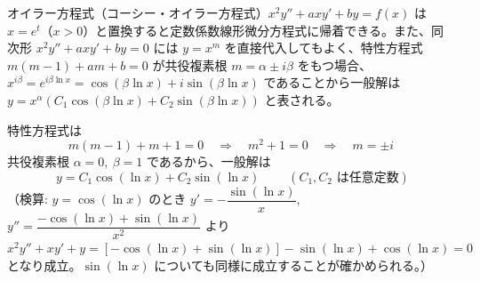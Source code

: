 
オイラー方程式（コーシー・オイラー方程式）$x^{2}y'' + axy' + by = f(x)$ は $x = e^{t}$（$x>0$）と置換すると定数係数線形微分方程式に帰着できる。また、同次形 $x^{2}y''+axy'+by=0$ には $y=x^{m}$ を直接代入してもよく、特性方程式 $m(m-1)+am+b=0$ が共役複素根 $m=\alpha\pm i\beta$ をもつ場合、$x^{i\beta}=e^{i\beta\ln x}=\cos(\beta\ln x)+i\sin(\beta\ln x)$ であることから一般解は $y = x^{\alpha}\left(C_{1}\cos(\beta\ln x)+C_{2}\sin(\beta\ln x)\right)$ と表される。

特性方程式は
\[
m(m-1) + m + 1 = 0
\quad\Longrightarrow\quad
m^{2} + 1 = 0
\quad\Longrightarrow\quad
m = \pm i
\]
共役複素根 $\alpha = 0,\ \beta = 1$ であるから、一般解は
\[
\boxed{\; y = C_{1}\cos(\ln x) + C_{2}\sin(\ln x) \;}
\qquad (C_{1}, C_{2} \text{ は任意定数})
\]
（検算: $y=\cos(\ln x)$ のとき $y' = -\dfrac{\sin(\ln x)}{x}$, $y'' = \dfrac{-\cos(\ln x) + \sin(\ln x)}{x^{2}}$ より
$x^{2}y''+xy'+y = \left[-\cos(\ln x)+\sin(\ln x)\right] - \sin(\ln x) + \cos(\ln x) = 0$ となり成立。$\sin(\ln x)$ についても同様に成立することが確かめられる。）
